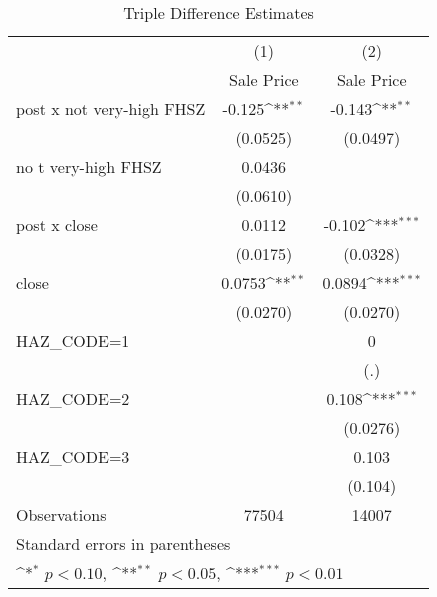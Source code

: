 \begin{table}[htbp]\centering
\def\sym#1{\ifmmode^{#1}\else\(^{#1}\)\fi}
\caption{Triple Difference Estimates\label{tabl}}
\begin{tabular}{l*{2}{c}}
\hline\hline
                    &\multicolumn{1}{c}{(1)}&\multicolumn{1}{c}{(2)}\\
                    &\multicolumn{1}{c}{Sale Price}&\multicolumn{1}{c}{Sale Price}\\
\hline
post x not very-high FHSZ&      -0.125\sym{**} &      -0.143\sym{**} \\
                    &    (0.0525)         &    (0.0497)         \\
[1em]
no t very-high FHSZ &      0.0436         &                     \\
                    &    (0.0610)         &                     \\
[1em]
post x close        &      0.0112         &      -0.102\sym{***}\\
                    &    (0.0175)         &    (0.0328)         \\
[1em]
close               &      0.0753\sym{**} &      0.0894\sym{***}\\
                    &    (0.0270)         &    (0.0270)         \\
[1em]
HAZ\_CODE=1          &                     &           0         \\
                    &                     &         (.)         \\
[1em]
HAZ\_CODE=2          &                     &       0.108\sym{***}\\
                    &                     &    (0.0276)         \\
[1em]
HAZ\_CODE=3          &                     &       0.103         \\
                    &                     &     (0.104)         \\
\hline
Observations        &       77504         &       14007         \\
\hline\hline
\multicolumn{3}{l}{\footnotesize Standard errors in parentheses}\\
\multicolumn{3}{l}{\footnotesize \sym{*} \(p<0.10\), \sym{**} \(p<0.05\), \sym{***} \(p<0.01\)}\\
\end{tabular}
\end{table}
